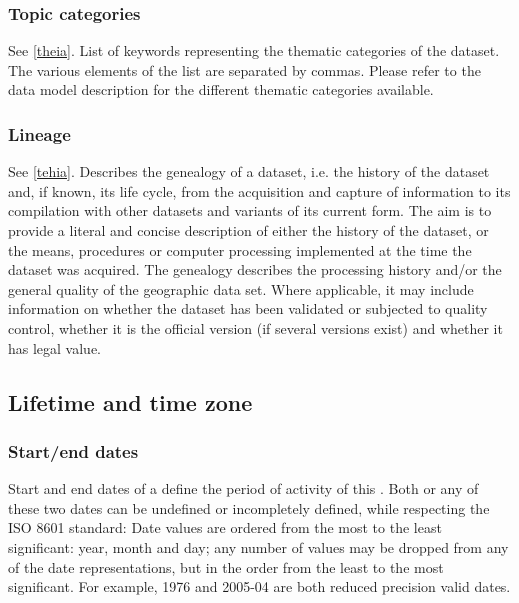 \subsubsection{Topic categories}
See \ref{theia}. List of keywords representing the thematic categories of the dataset. The various elements of the list are separated by commas. Please refer to the data model description for the different thematic categories available.

\subsubsection{Lineage}
See \ref{tehia}. Describes the genealogy of a dataset, i.e. the history of the dataset and, if known, its life cycle, from the acquisition and capture of information to its compilation with other datasets and variants of its current form. The aim is to provide a literal and concise description of either the history of the dataset, or the means, procedures or computer processing implemented at the time the dataset was acquired. The genealogy describes the processing history and/or the general quality of the geographic data set. Where applicable, it may include information on whether the dataset has been validated or subjected to quality control, whether it is the official version (if several versions exist) and whether it has legal value.

\subsection{Lifetime and time zone}

\subsubsection{Start/end dates}

Start and end dates of a  define the period of activity of this . Both or any of these two dates can be undefined or incompletely defined, while respecting the ISO 8601 standard: Date values are ordered from the most to the least significant: year, month and day; any number of values may be dropped from any of the date representations, but in the order from the least to the most significant. For example, 1976 and 2005-04 are both reduced precision valid dates.

